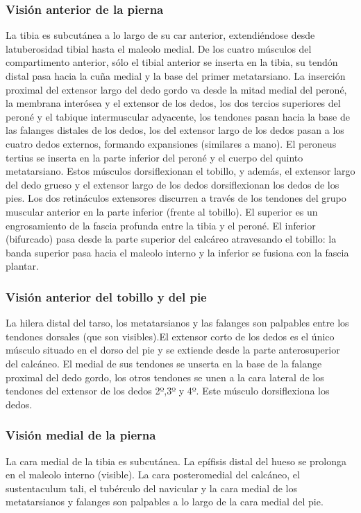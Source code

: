 \documentclass[a4paper,12pt]{article} %
\begin{document}
\begin{appendices}
\subsubsection{Visión anterior de la pierna}
La tibia es subcutánea a lo largo de su car anterior, extendiéndose desde latuberosidad tibial hasta el maleolo medial. De los cuatro músculos del compartimento anterior, sólo el tibial anterior se inserta en la tibia, su tendón distal pasa hacia la cuña medial y la base del primer metatarsiano. La inserción proximal del extensor largo del dedo gordo va desde la mitad medial del peroné, la membrana interósea y el extensor de los dedos, los dos tercios superiores del peroné y el tabique intermuscular adyacente, los tendones pasan hacia la base de las falanges distales de los dedos, los del extensor largo de los dedos pasan a los cuatro dedos externos, formando expansiones (similares a mano). El peroneus tertius se inserta en la parte inferior del peroné y el cuerpo del quinto metatarsiano. Estos músculos dorsiflexionan el tobillo, y además, el extensor largo del dedo grueso y el extensor largo de los dedos dorsiflexionan los dedos de los pies.
Los dos retináculos extensores discurren a través de los tendones del grupo muscular anterior en la parte inferior (frente al tobillo). El superior es un engrosamiento de la fascia profunda entre la tibia y el peroné. El inferior (bifurcado) pasa desde la parte superior del calcáreo atravesando el tobillo: la banda superior pasa hacia el maleolo interno y la inferior se fusiona con la fascia plantar.

\subsubsection{Visión anterior del tobillo y del pie}
La hilera distal del tarso, los metatarsianos y las falanges son palpables entre los tendones dorsales (que son visibles).El extensor corto de los dedos es el único músculo situado en el dorso del pie y se extiende desde la parte anterosuperior del calcáneo. El medial de sus tendones se unserta en la base de la falange proximal del dedo gordo, los otros tendones se unen a la cara lateral de los tendones del extensor de los dedos 2º,3º y 4º. Este músculo dorsiflexiona los dedos.

\subsubsection{Visión medial de la pierna}
La cara medial de la tibia es subcutánea. La epífisis distal del hueso se prolonga en el maleolo interno (visible). La cara posteromedial del calcáneo, el sustentaculum tali, el tubérculo del navicular y la cara medial de los metatarsianos y falanges son palpables a lo largo de la cara medial del pie.


\end{appendices}
\end{document}
